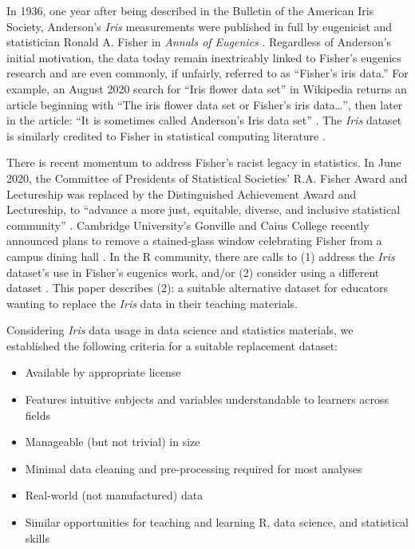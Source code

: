 In 1936, one year after being described in the Bulletin of the American Iris Society, Anderson's \emph{Iris} measurements were published in full by eugenicist and statistician Ronald A. Fisher in \emph{Annals of Eugenics} \citep{fisher_use_1936}. Regardless of Anderson's initial motivation, the data today remain inextricably linked to Fisher's eugenics research and are even commonly, if unfairly, referred to as ``Fisher's iris data.'' For example, an August 2020 search for ``Iris flower data set'' in Wikipedia returns an article beginning with ``The iris flower data set or Fisher's iris data\ldots{}'', then later in the article: ``It is sometimes called Anderson's Iris data set'' \citep{wikipedia_iris_2020}. The \emph{Iris} dataset is similarly credited to Fisher in statistical computing literature \citep[\citet{wang_matlab_2015}, \citet{woods_how_2015}, \citet{chen_unsupervised_2018}]{trendafilov_simple_2009}.

There is recent momentum to address Fisher's racist legacy in statistics. In June 2020, the Committee of Presidents of Statistical Societies' R.A. Fisher Award and Lectureship was replaced by the Distinguished Achievement Award and Lectureship, to ``advance a more just, equitable, diverse, and inclusive statistical community'' \citep{noauthor_institute_2020}. Cambridge University's Gonville and Caius College recently announced plans to remove a stained-glass window celebrating Fisher from a campus dining hall \citep{noauthor_sir_2020}. In the R community, there are calls to (1) address the \emph{Iris} dataset's use in Fisher's eugenics work, and/or (2) consider using a different dataset \citep[\citet{garrick_aden-buie_lets_2020}]{poisot_timothee_its_2020}. This paper describes (2): a suitable alternative dataset for educators wanting to replace the \emph{Iris} data in their teaching materials.

Considering \emph{Iris} data usage in data science and statistics materials, we established the following criteria for a suitable replacement dataset:

\begin{itemize}
\tightlist
\item
  Available by appropriate license
\item
  Features intuitive subjects and variables understandable to learners across fields
\item
  Manageable (but not trivial) in size
\item
  Minimal data cleaning and pre-processing required for most analyses
\item
  Real-world (not manufactured) data
\item
  Similar opportunities for teaching and learning R, data science, and statistical skills
\end{itemize}

